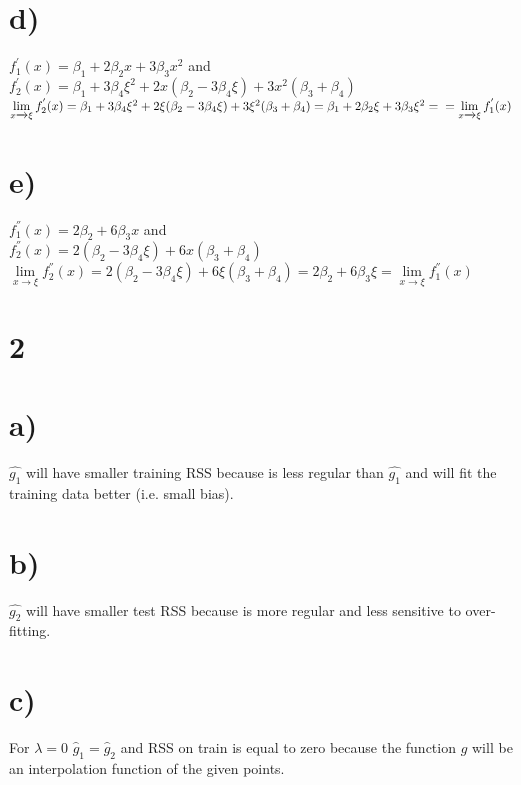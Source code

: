 \documentclass[12pt]{article}
\begin{document}
\section*{d)}
$f_1^{'}(x) = \beta_1 + 2\beta_2x + 3\beta_3x^2$ and \\ $f_2^{'}(x) = \beta_1 + 3\beta_4\xi^2 + 2x(\beta_2 - 3\beta_4\xi) + 3x^2(\beta_3 + \beta_4)$\vspace{0.3 cm}\newline
$\lim\limits_{x \xrightarrow{}\xi}f_2^{'}(x) = \beta_1 + 3\beta_4\xi^2 + 2\xi(\beta_2 - 3\beta_4\xi) + 3\xi^2(\beta_3 + \beta_4) = \beta_1 + 2\beta_2\xi + 3\beta_3\xi^2 = \\
 = \lim\limits_{x\xrightarrow{}\xi}f_1^{'}(x)$
 \section*{e)}
$f_1^{''}(x) = 2\beta_2 + 6\beta_3x$ and \\ $f_2^{''}(x) = 2(\beta_2 - 3\beta_4\xi) + 6x(\beta_3 + \beta_4)$\vspace{0.3 cm}\newline
$\lim\limits_{x \xrightarrow{}\xi}f_2^{''}(x) =  2(\beta_2 - 3\beta_4\xi) + 6\xi(\beta_3 + \beta_4) = 2\beta_2 + 6\beta_3\xi = \lim\limits_{x \xrightarrow{}\xi}f_1^{''}(x)$
\section*{2}

\section*{a)} $\hat{g_1}$ will have smaller training RSS because is less regular than $\hat{g_1}$ and will fit the training data better (i.e. small bias).
\section*{b)} $\hat{g_2}$ will have smaller test RSS because is more regular and less sensitive to over-fitting.
\section*{c)} For $\lambda = 0$ $\hat{g}_1 = \hat{g}_2$ and RSS on train is equal to zero because the function $g$ will be an interpolation function of the given points.
\end{document}
